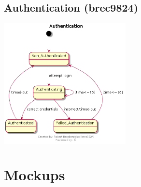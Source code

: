 \documentclass[11pt]{report}
\begin{document}
    \section{Authentication (brec9824)}
        \begin{minipage}{1\textwidth}
            \begin{center}
                \includegraphics[width=0.5\textwidth]{diagrams/statechart-authentication-brec9824}
            \end{center}
        \end{minipage}


\chapter{Mockups}
\end{document}
